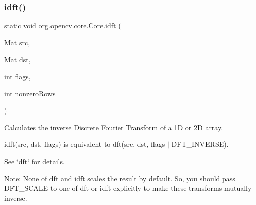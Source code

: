 \subsubsection{\texorpdfstring{idft()}{idft()}\hspace{0.1cm}{\footnotesize\ttfamily [1/2]}}
{\footnotesize\ttfamily static void org.\+opencv.\+core.\+Core.\+idft (\begin{DoxyParamCaption}\item[{\mbox{\hyperlink{classorg_1_1opencv_1_1core_1_1_mat}{Mat}}}]{src,  }\item[{\mbox{\hyperlink{classorg_1_1opencv_1_1core_1_1_mat}{Mat}}}]{dst,  }\item[{int}]{flags,  }\item[{int}]{nonzero\+Rows }\end{DoxyParamCaption})\hspace{0.3cm}{\ttfamily [static]}}

Calculates the inverse Discrete Fourier Transform of a 1D or 2D array.

{\ttfamily idft(src, dst, flags)} is equivalent to {\ttfamily dft(src, dst, flags $\vert$ D\+F\+T\+\_\+\+I\+N\+V\+E\+R\+SE)}.

See \char`\"{}dft\char`\"{} for details.

Note\+: None of {\ttfamily dft} and {\ttfamily idft} scales the result by default. So, you should pass {\ttfamily D\+F\+T\+\_\+\+S\+C\+A\+LE} to one of {\ttfamily dft} or {\ttfamily idft} explicitly to make these transforms mutually inverse.


